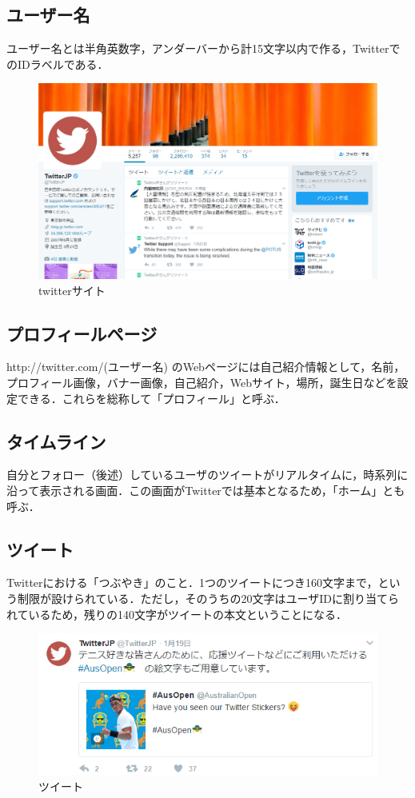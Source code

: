 \subsection{ユーザー名}
ユーザー名とは半角英数字，アンダーバーから計15文字以内で作る，TwitterでのIDラベルである．

\clearpage
\begin{figure}[htb]
\centering
\includegraphics[width=15cm]{twitter.png}
\caption{twitterサイト}\label{twitter}
\end{figure}
\subsection{プロフィールページ}
http://twitter.com/(ユーザー名) のWebページには自己紹介情報として，名前，プロフィール画像，バナー画像，自己紹介，Webサイト，場所，誕生日などを設定できる．これらを総称して「プロフィール」と呼ぶ．

\subsection{タイムライン}
自分とフォロー（後述）しているユーザのツイートがリアルタイムに，時系列に沿って表示される画面．この画面がTwitterでは基本となるため，「ホーム」とも呼ぶ．

\subsection{ツイート}
Twitterにおける「つぶやき」のこと．1つのツイートにつき160文字まで，という制限が設けられている．ただし，そのうちの20文字はユーザIDに割り当てられているため，残りの140文字がツイートの本文ということになる．

\clearpage
\begin{figure}[htb]
\centering
\includegraphics[width=15cm]{tweet.png}
\caption{ツイート}\label{ツイート}
\end{figure}

